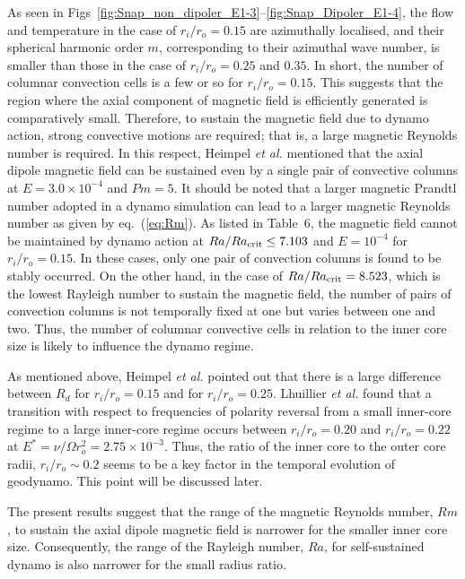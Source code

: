 {\color{red}
As seen in Figs~\ref{fig:Snap_non_dipoler_E1-3}--\ref{fig:Snap_Dipoler_E1-4}, the flow and temperature in the case of $r_i / r_o = 0.15$ are azimuthally localised, and their spherical harmonic order $m$, corresponding to their azimuthal wave number, is smaller than those in the case of $r_i / r_o = 0.25$ and $0.35$.
In short, the number of columnar convection cells is a few or so for $r_i / r_o = 0.15$.
This suggests that the region where the axial component of magnetic field is efficiently generated is comparatively small.
Therefore, to sustain the magnetic field due to dynamo action, strong convective motions are required; that is, a large magnetic Reynolds number is required.
In this respect, Heimpel {\it et al.}  mentioned that the axial dipole magnetic field can be sustained even by a single pair of convective columns at $E = 3.0 \times 10^{-4}$ and $Pm = 5$.
It should be noted that a larger magnetic Prandtl number adopted in a dynamo simulation can lead to a larger magnetic Reynolds number as given by eq.~(\ref{eq:Rm}).
As listed in Table~6, the magnetic field cannot be maintained by dynamo action at $Ra / Ra_{\rm crit} \le 7.103$ and $E = 10^{-4}$ for $r_i / r_o = 0.15$.
In these cases, only one pair of convection columns is found to be stably occurred.
On the other hand, in the case of $Ra / Ra_{\rm crit} = 8.523$, which is the lowest Rayleigh number to sustain the magnetic field, the number of pairs of convection columns is not temporally fixed at one but varies between one and two.
Thus, the number of columnar convective cells in relation to the inner core size is likely to influence the dynamo regime.

As mentioned above, Heimpel {\it et al.}  pointed out that there is a large difference between $R_d$ for $r_i / r_o = 0.15$ and for $r_i / r_o = 0.25$.
Lhuillier {\it et al.}  found that a transition with respect to frequencies of polarity reversal from a small inner-core regime to a large inner-core regime occurs between $r_i / r_o = 0.20$ and $r_i / r_o = 0.22$ at $E^* = \nu / \Omega r_o^2 = 2.75 \times 10^{-3}$.
Thus, the ratio of the inner core to the outer core radii, $r_i / r_o \sim 0.2$ seems to be a key factor in the temporal evolution of geodynamo.
This point will be discussed later.

The present results suggest that the range of the magnetic Reynolds number, $Rm$, to sustain the axial dipole magnetic field is narrower for the smaller inner core size.
Consequently, the range of the Rayleigh number, $Ra$, for self-sustained dynamo is also narrower for the small radius ratio.
}

